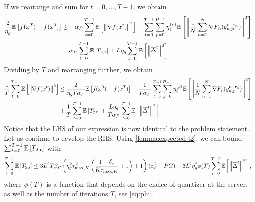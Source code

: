 If we rearrange and sum for $t = 0, \ldots, T - 1$, we obtain
\begin{equation}
    \begin{aligned}
        \frac{2}{\eta_g}\mathbb{E}\left[f(x^{T}) - f(x^0)\right] & \leq -\alpha_P \sum_{t=0}^{T-1} \mathbb{E}\left[ \left\lVert\nabla f(x^t)\right\rVert^2 \right] - \sum_{t=0}^{T-1} \sum_{p=0}^{P-1}\eta_{\ell}^{(p)} \mathbb{E}\left[\left\lVert\frac{1}{N}\sum_{n = 1}^N \nabla F_n(y^{t-\tau_n}_{n,p})\right\rVert^2\right] \\
                                                  & + \alpha_P \sum_{t=0}^{T-1} \mathbb{E}\left[T_{2,t}\right] + L\eta_g \sum_{t=0}^{T-1} \mathbb{E}\left[\left\lVert \overline{\Delta}^t \right\rVert^2\right].
    \end{aligned}
\end{equation}
Dividing by $T$ and rearranging further, we obtain
\begin{equation}
    \label{eq:rearranged}
    \begin{aligned}
        \frac{1}{T} \sum_{t=0}^{T-1} \mathbb{E}\left[\left\lVert\nabla f(x^t)\right\rVert^2\right] & \leq \frac{2}{\eta_g T \alpha_P}\mathbb{E}\left[f(x^{0}) - f(x^T)\right]  - \frac{1}{T\alpha_P} \sum_{t=0}^{T-1} \sum_{p=0}^{P-1}\eta_{\ell}^{(p)} \mathbb{E}\left[\left\lVert\frac{1}{N}\sum_{n = 1}^N \nabla F_n(y^{t-\tau_n}_{n,p})\right\rVert^2\right] \\
                                                                    & + \frac{1}{T} \sum_{t=0}^{T-1} \mathbb{E}\left[T_{2,t}\right] + \frac{L\eta_g}{T\alpha_P} \sum_{t=0}^{T-1} \mathbb{E}\left[\left\lVert \overline{\Delta}^t \right\rVert^2\right].
    \end{aligned}
\end{equation}
Notice that the LHS of our expression is now identical to the problem statement.
Let us continue to develop the RHS.
Using \cref{lemma:expected-t2}, we can bound $\sum_{t=0}^{T-1} \mathbb{E}\left[T_{2,t}\right]$ with
\begin{equation}
    \sum_{t=0}^{T-1} \mathbb{E}\left[T_{2,t}\right] \leq 3 L^2 T \beta_P \left( \eta^2_g \tau_{\max,K}^2 \left (\frac{1-\delta_c}{K \tau_{\max, K}} + 1 \right) + 1 \right)  (\sigma_{\ell}^2 + PG) + 3L^2 \eta_g^2 \phi(T) \sum_{t=0}^{T-2} \mathbb{E}\left[\left\lVert\overline{\Delta}^t\right\rVert^2\right],
\end{equation}
where $\phi(T)$ is a function that depends on the choice of quantizer at the server, as well as the number of iterations $T$, see \eqref{eq:phi}.

